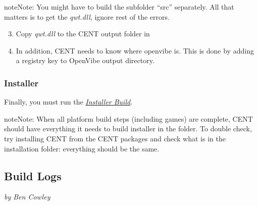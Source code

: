 \documentclass[letterpaper,10pt,english]{sphinxmanual}
\begin{document}
\begin{notice}{note}{Note:}
You might have to build the subfolder ``src'' separately. All that matters is to get the \emph{qwt.dll}, ignore rest of the errors.
\end{notice}
\begin{enumerate}
\setcounter{enumi}{2}
\item {} 
Copy \emph{qwt.dll} to the CENT output folder in 

\item {} 
In addition, CENT needs to know where openvibe is. This is done by adding a registry key to OpenVibe output directory.
\begin{quote}

\end{quote}

\end{enumerate}


\subsubsection{Installer}
\label{index:installer}
Finally, you must run the {\hyperref[index:installer-build]{\emph{Installer Build}}}.

\begin{notice}{note}{Note:}
When all platform build steps (including games) are complete, CENT should have everything it needs to build installer in the  folder. To double check, try installing CENT from the CENT packages and check what is in the installation folder: everything should be the same.
\end{notice}


\subsection{\textbf{Build Logs}}
\label{index:build-log}\label{index:build-logs}
\emph{by Ben Cowley}
\end{document}
